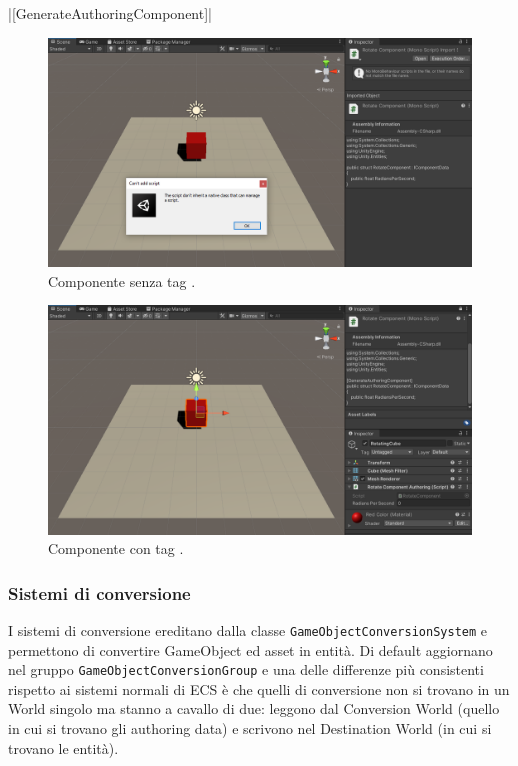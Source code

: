 |[GenerateAuthoringComponent]|

\begin{figure}[!ht]
    \centering
    \includegraphics[width=0.95\columnwidth]{gfx/imgs/chapter2/NonAuthoringComponentExample.png}
    \caption{Componente senza tag .}
    \label{fig:non-authoring-example}
\end{figure}

\begin{figure}[!ht]
    \centering
    \includegraphics[width=0.95\columnwidth]{gfx/imgs/chapter2/AuthoringComponentExample.png}
    \caption{Componente con tag .}
    \label{fig:authoring-example}
\end{figure}

\subsubsection{Sistemi di conversione}
I sistemi di conversione ereditano dalla classe \verb|GameObjectConversionSystem| e permettono di convertire GameObject ed asset in entità. Di default aggiornano nel gruppo \verb|GameObjectConversionGroup| e una delle differenze più consistenti rispetto ai sistemi normali di ECS è che quelli di conversione non si trovano in un World singolo ma stanno a cavallo di due: leggono dal Conversion World (quello in cui si trovano gli authoring data) e scrivono nel Destination World (in cui si trovano le entità).

